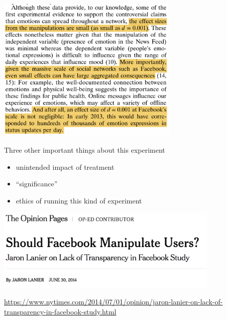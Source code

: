 \documentclass[aspectratio=169]{beamer}
\begin{document}
\begin{frame}

\begin{center}
\includegraphics[width=0.65\textwidth]{figures/kramer_experimental_2014_small_effect}
\end{center}

\end{frame}
\begin{frame}

Three other important things about this experiment
\begin{itemize}
\item unintended impact of treatment
\item ``significance''
\item ethics of running this kind of experiment
\end{itemize}

\end{frame}
\begin{frame}

\begin{center}
\includegraphics[width=0.8\textwidth]{figures/lanier_should_2014_title}
\end{center}

{\tiny \url{https://www.nytimes.com/2014/07/01/opinion/jaron-lanier-on-lack-of-transparency-in-facebook-study.html}}\\ 


\end{frame}
\end{document}
